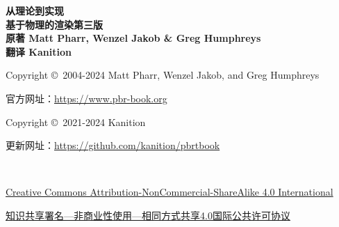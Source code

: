 \noindent \textbf{\LARGE 从理论到实现}\vspace{8pt}\\
\noindent \textbf{\Huge 基于物理的渲染}\qquad\textbf{\large 第三版}\vspace{8pt}\\
\noindent \textbf{\large 原著 \quad Matt Pharr, Wenzel Jakob \& Greg Humphreys}\vspace{5pt}\\
\noindent \textbf{\large 翻译 \quad Kanition}\vspace{12pt}\\


\noindent Copyright \copyright\ 2004-2024 Matt Pharr, Wenzel Jakob, and Greg Humphreys

\noindent 官方网址：\url{https://www.pbr-book.org}\\


\noindent Copyright \copyright\ 2021-2024 Kanition

\noindent 更新网址：\url{https://github.com/kanition/pbrtbook}

\noindent {\ttfamily\small}\\


\noindent \href{https://creativecommons.org/licenses/by-nc-sa/4.0/}
{Creative Commons Attribution-NonCommercial-ShareAlike 4.0 International}

\noindent \href{https://creativecommons.org/licenses/by-nc-sa/4.0/deed.zh-hans}
{知识共享署名—非商业性使用—相同方式共享4.0国际公共许可协议}

\\


